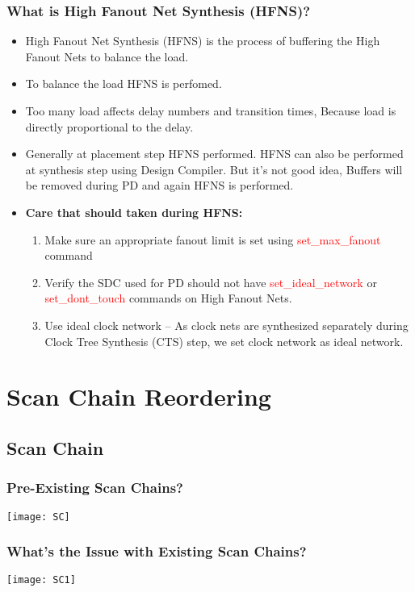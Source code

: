 \documentclass[compress]{beamer}
\begin{document}
\begin{frame}
	\frametitle{What is High Fanout Net Synthesis (HFNS)?}
	\begin{itemize}
		\item High Fanout Net Synthesis (HFNS) is the process of buffering the High Fanout Nets to balance the load.
		
		\item To balance the load HFNS is perfomed.
		\item Too many load affects delay numbers and transition times, Because load is directly proportional to the delay.
		\item Generally at placement step HFNS performed. HFNS can also be performed at synthesis step using Design Compiler. But it’s not good idea, Buffers will be removed during PD and again HFNS is performed.
		\item \textbf{Care that should taken during HFNS:}
	\begin{enumerate}
		\item Make sure an appropriate fanout limit is set using \textcolor{red}{set\_max\_fanout} command
		\item Verify the SDC used for PD should not have \textcolor{red}{set\_ideal\_network} or \textcolor{red}{set\_dont\_touch} commands on High Fanout Nets.
		\item Use ideal clock network – As clock nets are synthesized separately during Clock Tree Synthesis (CTS) step, we set clock network as ideal network.
		
	\end{enumerate}
		
	\end{itemize}
\end{frame}

\section[Scan Chain]{Scan Chain Reordering}
\subsection[Scan Chain]{Scan Chain}
\begin{frame}
	\frametitle{Pre-Existing Scan Chains?}
	\begin{center}
		\texttt{[image: SC]}
	\end{center}
\end{frame}

\begin{frame}
	\frametitle{What’s the Issue with Existing Scan Chains?}
	\begin{center}
		\texttt{[image: SC1]}
	\end{center}
\end{frame}
\end{document}
